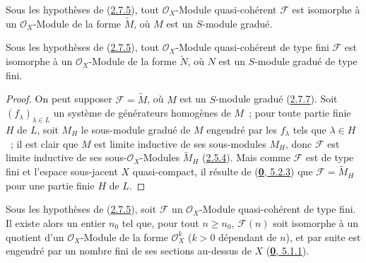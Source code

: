 \begin{corollary}[2.7.7]
\label{II.2.7.7-fr}
Sous les hypothèses de \textup{(\hyperref[II.2.7.5-fr]{2.7.5})}, tout
$\mathcal{O}_X$-Module quasi-cohérent $\mathcal{F}$ est isomorphe à un
$\mathcal{O}_X$-Module de la forme $\widetilde{M}$, où $M$ est un $S$-module
gradué.
\end{corollary}

\begin{corollary}[2.7.8]
\label{II.2.7.8-fr}
Sous les hypothèses de \textup{(\hyperref[II.2.7.5-fr]{2.7.5})}, tout
$\mathcal{O}_X$-Module quasi-cohérent de type fini $\mathcal{F}$ est
isomorphe à un $\mathcal{O}_X$-Module de la forme $\widetilde{N}$, où $N$ est
un $S$-module gradué de type fini.
\end{corollary}

\begin{proof}
On peut supposer $\mathcal{F}=\widetilde{M}$, où $M$ est un $S$-module gradué
(\hyperref[II.2.7.7-fr]{2.7.7}). Soit $(f_\lambda)_{\lambda\in L}$ un
système de générateurs homogènes de $M$~; pour toute partie finie $H$ de $L$,
soit $M_H$ le sous-module gradué de $M$ engendré par les $f_\lambda$ tels que
$\lambda\in H$~; il est clair que $M$ est limite inductive de ses sous-modules
$M_H$, donc $\mathcal{F}$ est limite inductive de ses sous-$\mathcal{O}_X$-Modules
$\widetilde{M}_H$ (\hyperref[II.2.5.4-fr]{2.5.4}). Mais comme $\mathcal{F}$
est de type fini et l'espace sous-jacent $X$ quasi-compact, il résulte de
(\hyperref[0.5.2.3-fr]{\textbf{0}, 5.2.3}) que $\mathcal{F}=\widetilde{M}_H$ pour une
partie finie $H$ de $L$.
\end{proof}

\begin{corollary}[2.7.9]
\label{II.2.7.9-fr}
Sous les hypothèses de \textup{(\hyperref[II.2.7.5-fr]{2.7.5})}, soit $\mathcal{F}$ un
$\mathcal{O}_X$-Module quasi-cohérent de type fini. Il existe alors un entier
$n_0$ tel que, pour tout $n\geq n_0$, $\mathcal{F}(n)$ soit isomorphe à un
quotient d'un $\mathcal{O}_X$-Module de la forme $\mathcal{O}_X^k$ ($k>0$
dépendant de $n$), et par suite est engendré par un nombre fini de ses sections
au-dessus de $X$ \textup{(\hyperref[0.5.1.1-fr]{\textbf{0}, 5.1.1})}.
\end{corollary}

